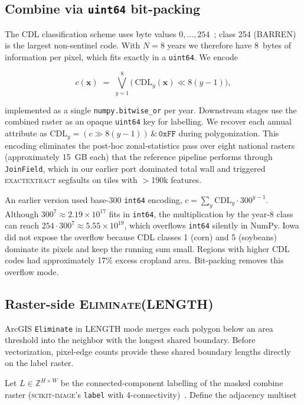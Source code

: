 \documentclass[preprint,12pt]{elsarticle}
\begin{document}
\subsection{Combine via \texttt{uint64} bit-packing}
\label{sec:method-combine}

The CDL classification scheme uses byte values
$0,\ldots,254$~\cite{boryan2011cdl}; class 254 (BARREN) is the largest
non-sentinel code. With $N=8$ years we therefore have 8~bytes of
information per pixel, which fits exactly in a \texttt{uint64}. We
encode

\[
c(\mathbf{x}) \;=\; \bigvee_{y=1}^{8} \bigl(\,\text{CDL}_y(\mathbf{x}) \ll 8(y-1)\bigr),
\]

implemented as a single \texttt{numpy.bitwise\_or} per year. Downstream stages
use the combined raster as an opaque \texttt{uint64} key for labelling. We
recover each annual attribute as
$\text{CDL}_y = (c \gg 8(y-1)) \,\&\, \mathtt{0xFF}$ during polygonization.
This encoding eliminates the post-hoc
zonal-statistics pass over eight national rasters (approximately 15~GB each)
that the reference pipeline performs through \texttt{JoinField}, which
in our earlier port dominated total wall and triggered
\textsc{exactextract} segfaults on tiles with $>$190k features.

An earlier version used base-$300$ \texttt{int64} encoding,
$c = \sum_y \text{CDL}_y \cdot 300^{y-1}$. Although $300^7 \approx
2.19 \times 10^{17}$ fits in \texttt{int64}, the multiplication by
the year-8 class can reach $254 \cdot 300^7 \approx 5.55 \times 10^{19}$,
which overflows \texttt{int64} silently in NumPy. Iowa did not expose the
overflow because CDL classes 1 (corn) and 5 (soybeans) dominate its pixels and
keep the running sum small. Regions with higher CDL codes had approximately 17\%
excess cropland area. Bit-packing removes this overflow mode.

\subsection{Raster-side \textsc{Eliminate(LENGTH)}}
\label{sec:method-eliminate}

ArcGIS \texttt{Eliminate} in \textsc{LENGTH} mode merges each polygon below an
area threshold into the neighbor with the longest shared boundary. Before
vectorization, pixel-edge counts provide these shared boundary lengths
directly on the label raster.

Let $L \in \mathbb{Z}^{H \times W}$ be the connected-component
labelling of the masked combine raster (\textsc{scikit-image}'s
\texttt{label} with 4-connectivity)~\cite{vanderwalt2014scikit}. Define the
adjacency multiset
\end{document}
